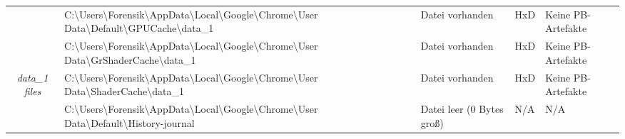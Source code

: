 \begin{appendices}
{\begin{landscape}
\begin{table}[h!]
{\begin{tabular}{cllll}
		\multicolumn{1}{|c|}{}                                                        & \multicolumn{1}{l|}{\cellcolor[HTML]{34CDF9}C:\textbackslash{}Users\textbackslash{}Forensik\textbackslash{}AppData\textbackslash{}Local\textbackslash{}Google\textbackslash{}Chrome\textbackslash{}User   Data\textbackslash{}Default\textbackslash{}GPUCache\textbackslash{}data\_1}                                                                                           & \multicolumn{1}{l|}{\cellcolor[HTML]{009901}Datei vorhanden}                                      & \multicolumn{1}{l|}{HxD}                                   & \multicolumn{1}{l|}{\cellcolor[HTML]{F8A102}Keine PB-Artefakte} \\ \cline{2-5} 
		\multicolumn{1}{|c|}{}                                                        & \multicolumn{1}{l|}{\cellcolor[HTML]{34CDF9}C:\textbackslash{}Users\textbackslash{}Forensik\textbackslash{}AppData\textbackslash{}Local\textbackslash{}Google\textbackslash{}Chrome\textbackslash{}User   Data\textbackslash{}GrShaderCache\textbackslash{}data\_1}                                                                                                             & \multicolumn{1}{l|}{\cellcolor[HTML]{009901}Datei vorhanden}                                      & \multicolumn{1}{l|}{HxD}                                   & \multicolumn{1}{l|}{\cellcolor[HTML]{F8A102}Keine PB-Artefakte} \\ \cline{2-5} 
		\multicolumn{1}{|c|}{\multirow{-5}{*}{\textit{data\_1 files}}}                & \multicolumn{1}{l|}{\cellcolor[HTML]{34CDF9}C:\textbackslash{}Users\textbackslash{}Forensik\textbackslash{}AppData\textbackslash{}Local\textbackslash{}Google\textbackslash{}Chrome\textbackslash{}User   Data\textbackslash{}ShaderCache\textbackslash{}data\_1}                                                                                                               & \multicolumn{1}{l|}{\cellcolor[HTML]{009901}Datei vorhanden}                                      & \multicolumn{1}{l|}{HxD}                                   & \multicolumn{1}{l|}{\cellcolor[HTML]{F8A102}Keine PB-Artefakte} \\ \hline
		\multicolumn{1}{|c|}{}                                                        & \multicolumn{1}{l|}{\cellcolor[HTML]{34CDF9}C:\textbackslash{}Users\textbackslash{}Forensik\textbackslash{}AppData\textbackslash{}Local\textbackslash{}Google\textbackslash{}Chrome\textbackslash{}User   Data\textbackslash{}Default\textbackslash{}History-journal}                                                                                                           & \multicolumn{1}{l|}{\cellcolor[HTML]{AB70E9}Datei leer (0 Bytes groß)}                            & \multicolumn{1}{l|}{\cellcolor[HTML]{C0C0C0}N/A}           & \multicolumn{1}{l|}{\cellcolor[HTML]{C0C0C0}N/A}                \\ \cline{2-5} 

\end{tabular}}
\end{table}
\end{landscape}}
\end{appendices}
